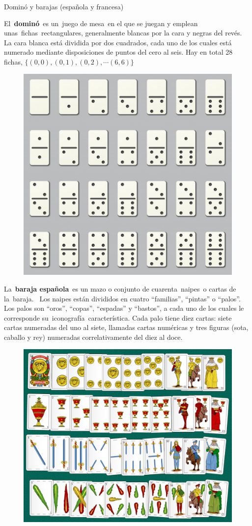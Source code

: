\begin{myexampleblock}{Dominó y barajas (española y francesa)}

\begin{small}
El \textbf{dominó} es un juego de mesa en el que se juegan y emplean unas fichas rectangulares, generalmente blancas por la cara y negras del revés. La cara blanca está dividida por dos cuadrados, cada uno de los cuales está numerado mediante disposiciones de puntos del cero al seis. Hay en total 28 fichas,  $\{(0,0),(0,1),(0,2), \cdots (6,6)\}$
	\begin{figure}[H]
			\centering
			\includegraphics[width=.6\textwidth]{imagenes/imagenes02/T02IM19.png}
	\end{figure}

\vspace{2mm} La \textbf{baraja española} es un mazo o conjunto de cuarenta naipes o cartas de la baraja.  Los naipes están divididos en cuatro ``familias'', ``pintas'' o ``palos''. Los palos son ``oros'', ``copas'', ``espadas'' y ``bastos'', a cada uno de los cuales le corresponde su iconografía característica. Cada palo tiene diez cartas: siete cartas numeradas del uno al siete, llamadas cartas numéricas y tres figuras (sota, caballo y rey) numeradas correlativamente del diez al doce. 
	\begin{figure}[H]
			\centering
			\includegraphics[width=.6\textwidth]{imagenes/imagenes02/T02IM20.png}
	\end{figure}


\end{small}
\end{myexampleblock}
